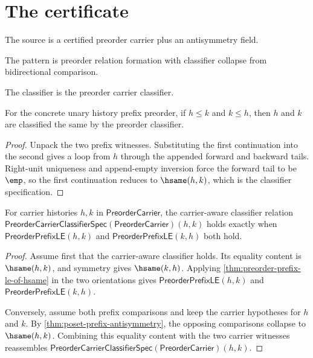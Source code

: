 \section{The certificate}

\begin{definition}
\label{def:poset-source-specification}
The source is a certified preorder carrier plus an antisymmetry field.
\end{definition}

\begin{definition}
\label{def:poset-pattern-specification}
The pattern is preorder relation formation with classifier collapse from bidirectional comparison.
\end{definition}

\begin{definition}
\label{def:poset-classifier-specification}
The classifier is the preorder carrier classifier.
\end{definition}

\begin{theorem}
\label{thm:poset-prefix-antisymmetry}
For the concrete unary history prefix preorder, if $h\le k$ and $k\le h$,
then $h$ and $k$ are classified the same by the preorder classifier.
\end{theorem}
\begin{proof}
Unpack the two prefix witnesses. Substituting the first continuation into the
second gives a loop from $h$ through the appended forward and backward tails.
Right-unit uniqueness and append-empty inversion force the forward tail to be
$\emp$, so the first continuation reduces to $\hsame(h,k)$, which is the
classifier specification.
\end{proof}

\begin{theorem}
\label{thm:poset-prefix-classifier-exactness}
For carrier histories $h,k$ in $\mathsf{PreorderCarrier}$, the carrier-aware
classifier relation
$\mathsf{PreorderCarrierClassifierSpec}(\mathsf{PreorderCarrier})(h,k)$ holds
exactly when $\mathsf{PreorderPrefixLE}(h,k)$ and
$\mathsf{PreorderPrefixLE}(k,h)$ both hold.
\end{theorem}
\begin{proof}
Assume first that the carrier-aware classifier holds. Its equality content is
$\hsame(h,k)$, and symmetry gives $\hsame(k,h)$. Applying
\autoref{thm:preorder-prefix-le-of-hsame} in the two orientations gives
$\mathsf{PreorderPrefixLE}(h,k)$ and $\mathsf{PreorderPrefixLE}(k,h)$.

Conversely, assume both prefix comparisons and keep the carrier hypotheses for
$h$ and $k$. By \autoref{thm:poset-prefix-antisymmetry}, the opposing
comparisons collapse to $\hsame(h,k)$. Combining this equality content with the
two carrier witnesses reassembles
$\mathsf{PreorderCarrierClassifierSpec}(\mathsf{PreorderCarrier})(h,k)$.
\end{proof}

